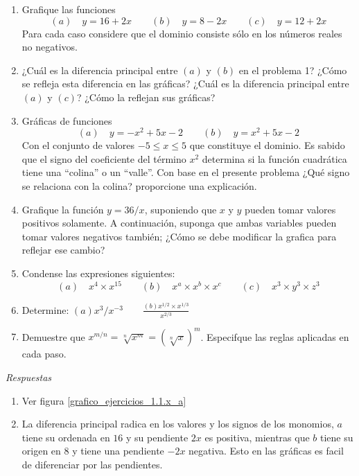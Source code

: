 \begin{ejercicio}
    \begin{enumerate}
        \item Grafique las funciones 
        \[
        (a) \quad y = 16 + 2x \qquad (b) \quad y = 8 - 2x \qquad (c) \quad y = 12 + 2x
        \]
        Para cada caso considere que el dominio consiste sólo en los números reales no negativos.
        \item ¿Cuál es la diferencia principal entre \((a)\) y \((b)\) en el problema 1? ¿Cómo se refleja esta diferencia en las gráficas? ¿Cuál es la diferencia principal entre \((a)\) y \((c)\)? ¿Cómo la reflejan sus gráficas?
        \item Gráficas de funciones 
        \[
        (a) \quad y = -x^2 + 5x - 2 \qquad (b) \quad y = x^2 + 5x - 2
        \]
        Con el conjunto de valores \(-5 \leq x \leq 5\) que constituye el dominio. Es sabido que el signo del coeficiente del término \(x^2\) determina si la función cuadrática tiene una ``colina'' o un ``valle''. Con base en el presente problema ¿Qué signo se relaciona con la colina? proporcione una explicación.
        \item Grafique la función \(y = 36/x\), suponiendo que \(x\) y \(y\) pueden tomar valores positivos solamente. A continuación, suponga que ambas variables pueden tomar valores negativos también; ¿Cómo se debe modificar la grafica para reflejar ese cambio?
        \item Condense las expresiones siguientes: 
        \[
        (a) \quad x^4 \times x^{15} \qquad (b) \quad x^a \times x^b \times x^c \qquad (c) \quad x^3 \times y^3 \times z^3
        \]
        \item Determine: \((a) x^3/x^{-3} \qquad \frac{(b)x^{1/2} \times x^{1/3}}{x^{2/3}}\)
        \item Demuestre que \(x^{m/n}=\sqrt[n]{x^m}=(\sqrt[n]{x})^m\). Especifque las reglas aplicadas en cada paso.
    \end{enumerate}

    \textit{Respuestas}

    \begin{enumerate}
        \item Ver figura \ref{grafico_ejercicios_1.1.x_a}

        \item La diferencia principal radica en los valores y los signos de los monomios, \(a\) tiene su ordenada en \(16\) y su pendiente \(2x\) es positiva, mientras que \(b\) tiene su origen en \(8\) y tiene una pendiente \(-2x\) negativa. Esto en las gráficas es facil de diferenciar por las pendientes. 
        

\end{enumerate}
\end{ejercicio}
